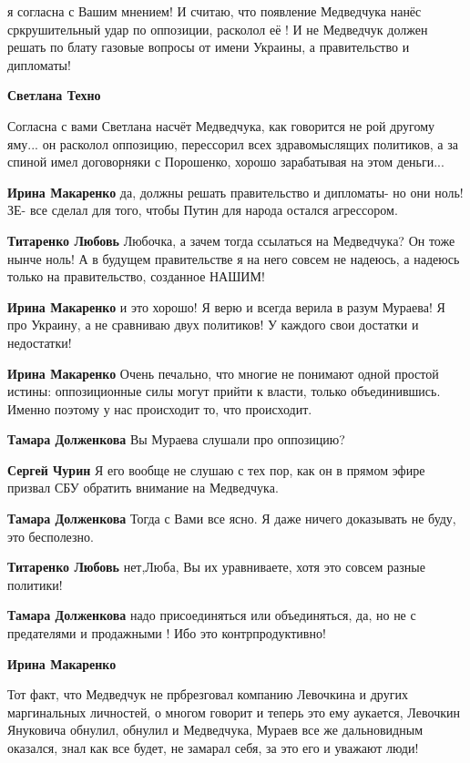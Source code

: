 \begin{itemize}
\begin{itemize}
я согласна с Вашим мнением!
И считаю, что появление Медведчука нанёс сркрушительный удар по оппозиции, расколол её !
И не Медведчук должен решать по блату газовые вопросы от имени Украины, а правительство и дипломаты!

\textbf{Светлана Техно} 

Согласна с вами Светлана насчёт Медведчука, как говорится не рой другому
яму... он расколол оппозицию, перессорил всех здравомыслящих политиков, а за
спиной имел договорняки с Порошенко, хорошо зарабатывая на этом деньги...

\textbf{Ирина Макаренко} да, должны решать правительство и дипломаты- но они ноль!
ЗЕ- все сделал для того, чтобы Путин для народа остался агрессором.

\textbf{Титаренко Любовь} Любочка, а зачем тогда ссылаться на Медведчука?
Он тоже нынче ноль!
А в будущем правительстве я на него совсем не надеюсь, а надеюсь только на правительство, созданное НАШИМ!

\textbf{Ирина Макаренко} и это хорошо!
Я верю и всегда верила в разум Мураева!
Я про Украину, а не сравниваю двух политиков!
У каждого свои достатки и недостатки!

\textbf{Ирина Макаренко} Очень печально, что многие не понимают одной простой истины: оппозиционные силы могут прийти к власти, только объединившись. Именно поэтому у нас происходит то, что происходит.

\textbf{Тамара Долженкова} Вы Мураева слушали про оппозицию?

\textbf{Сергей Чурин} Я его вообще не слушаю с тех пор, как он в прямом эфире призвал СБУ обратить внимание на Медведчука.

\textbf{Тамара Долженкова} Тогда с Вами все ясно. Я даже ничего доказывать не буду, это бесполезно.

\textbf{Титаренко Любовь} нет,Люба, Вы их уравниваете, хотя это совсем разные политики!

\textbf{Тамара Долженкова} надо присоединяться или объединяться, да, но не с предателями и продажными !
Ибо это контрпродуктивно!

\textbf{Ирина Макаренко} 

Тот факт, что Медведчук не прбрезговал компанию Левочкина и других маргинальных
личностей, о многом говорит и теперь это ему аукается, Левочкин Януковича
обнулил, обнулил и Медведчука, Мураев все же дальновидным оказался, знал как все
будет, не замарал себя, за это его и уважают люди!


\end{itemize}
\end{itemize}
